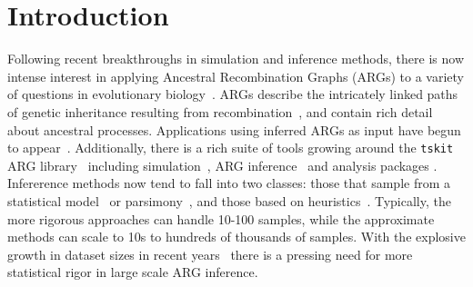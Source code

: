 \documentclass{article}
\begin{document}
\section{Introduction}
Following recent breakthroughs in simulation and inference methods,
there is now intense interest in applying Ancestral Recombination Graphs (ARGs)
to a variety of questions in evolutionary
biology~\citep{lewanski_era_2024,brandt_promise_2024}.
ARGs describe the intricately linked paths
of genetic inheritance resulting from
recombination~\citep{hudson_properties_1983,griffiths_ancestral_1996,wong_general_2023},
and contain rich detail about ancestral processes.
Applications using inferred ARGs as input have begun to
appear~\citep{osmond_estimating_2021,
fan_genealogical_2022,
hejase_deep_2022,
guo_recombination-aware_2022,
zhang_biobank-scale_2023,
nowbandegani_extremely_2023,
ignatieva_distribution_2023,
fan_likelihood_2023,
huang_estimating_2024}.
Additionally, there is a rich suite of tools growing around
the \texttt{tskit} ARG library~\citep{ralph_efficiently_2020}
including simulation~\citep{kelleher_efficient_2016,kelleher_efficient_2018,
adrion_community_2020,terasaki_geonomics_2021,
baumdicker_efficient_2021,
korfmann_weak_2022, petr_slendr_2023,tagami_tstrait_2024},
ARG inference~\citep{kelleher_inferring_2019,speidel_method_2019,
wohns_unified_2022,mahmoudi_bayesian_2022,
rasmussen_espalier_2022,
zhang_biobank-scale_2023,zhan_towards_2023} and analysis
packages
\citep{nowbandegani_extremely_2023,fan_likelihood_2023}.
Infererence methods now tend to fall into two classes: those that
sample from a statistical
model~\citep{rasmussen_genome-wide_2014,hubisz_mapping_2020,mahmoudi_bayesian_2022}
or parsimony~\citep{ignatieva_kwarg_2021,rasmussen_espalier_2022},
and those based on
heuristics~\citep{kelleher_inferring_2019,speidel_method_2019,
zhang_biobank-scale_2023}.
Typically, the more rigorous approaches can handle 10-100 samples,
while the approximate methods can scale to 10s to hundreds of
thousands of samples. With the explosive growth in dataset
sizes in recent years~\citep[e.g.][]{bycroft_genome_2018,halldorsson_sequences_2022,
all_genomic_2024} there is a pressing need for more statistical
rigor in large scale ARG inference.
\end{document}
